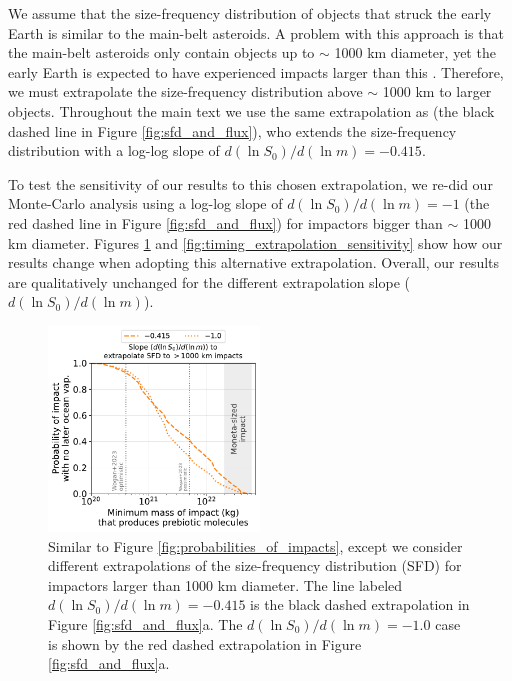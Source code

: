 \documentclass[manuscript]{aastex63}
\begin{document}
We assume that the size-frequency distribution of objects that struck the early Earth is similar to the main-belt asteroids. A problem with this approach is that the main-belt asteroids only contain objects up to $\sim$ 1000 km diameter, yet the early Earth is expected to have experienced impacts larger than this \citep{Marchi_2014}. Therefore, we must extrapolate the size-frequency distribution above $\sim$ 1000 km to larger objects. Throughout the main text we use the same extrapolation as \citet{Marchi_2014} (the black dashed line in Figure \ref{fig:sfd_and_flux}), who extends the size-frequency distribution with a log-log slope of $d (\ln S_0)/d (\ln m) = - 0.415$.

To test the sensitivity of our results to this chosen extrapolation, we re-did our Monte-Carlo analysis using a log-log slope of $d (\ln S_0)/d (\ln m) = - 1$ (the red dashed line in Figure \ref{fig:sfd_and_flux}) for impactors bigger than $\sim$ 1000 km diameter. Figures \ref{fig:probabilities_of_impacts_extrapolation_sens} and \ref{fig:timing_extrapolation_sensitivity} show how our results change when adopting this alternative extrapolation. Overall, our results are qualitatively unchanged for the different extrapolation slope ($d (\ln S_0)/d (\ln m)$).

\begin{figure}
  \centering
  \includegraphics[width=0.5\textwidth]{figures/probabilities_of_impacts_extrapolation_sens.pdf}
  \caption{Similar to Figure \ref{fig:probabilities_of_impacts}, except we consider different extrapolations of the size-frequency distribution (SFD) for impactors larger than 1000 km diameter. The line labeled $d (\ln S_0)/d (\ln m) = - 0.415$ is the black dashed extrapolation in Figure \ref{fig:sfd_and_flux}a. The $d (\ln S_0)/d (\ln m) = - 1.0$ case is shown by the red dashed extrapolation in Figure \ref{fig:sfd_and_flux}a.}
  \label{fig:probabilities_of_impacts_extrapolation_sens}
\end{figure}
\end{document}

